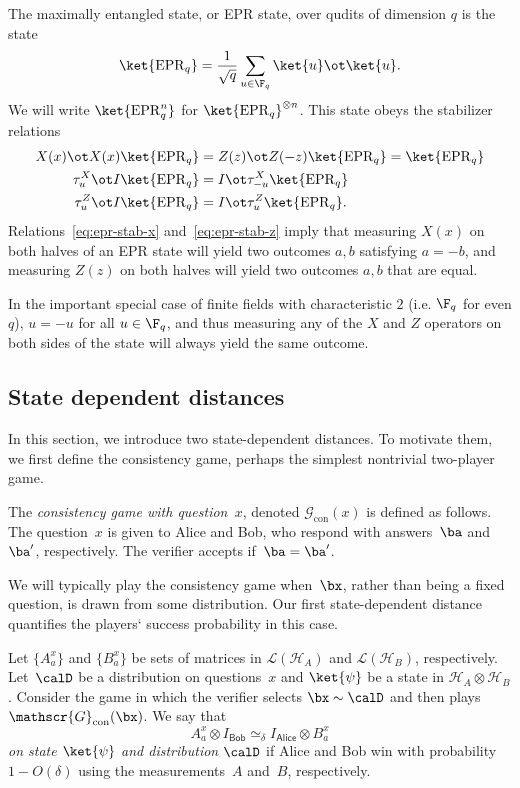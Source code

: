 \documentclass[11pt]{article}
\newcommand{\consistency}{\simeq}
\newcommand{\game}{\mathscr{G}}
\newcommand{\epr}{\mathrm{EPR}}
\newcommand{\reg}[1]{{\mathsf{#1}}}
\begin{document}
The maximally entangled state, or EPR state, over qudits of dimension
$q$ is the state
\[ \ket{\epr_q} = \frac{1}{\sqrt{q}} \sum_{u \in \F_q} \ket{u} \ot \ket{u}. \]
We will write $\ket{\epr_q^n}$ for $\ket{\epr_q}^{\otimes n}$.
This state obeys the stabilizer relations
\begin{align}
  X(x) \ot X(x) \ket{\epr_q} &= Z(z) \ot Z(-z) \ket{\epr_q} =
                             \ket{\epr_q} \label{eq:epr-stab} \\
  \tau^X_u \ot I \ket{\epr_q} &= I \ot \tau^X_{-u}
                              \ket{\epr_q} \label{eq:epr-stab-x} \\
  \tau^Z_u \ot I \ket{\epr_q} &= I \ot \tau^Z_{u} \ket{\epr_q} \label{eq:epr-stab-z}.
\end{align}
Relations~\eqref{eq:epr-stab-x} and~\eqref{eq:epr-stab-z} imply that
measuring $X(x)$ on both halves of an EPR state will yield two
outcomes $a,b$ satisfying $a = -b$, and measuring $Z(z)$ on both
halves will yield two outcomes $a,b$ that are equal.

In the important special case of finite fields with characteristic $2$
(i.e. $\F_q$ for even $q$), $u = -u$ for all $u \in \F_q$, and thus
measuring any of the $X$ and $Z$ operators on both sides of the state
will always yield the same outcome. 

  
\subsection{State dependent distances}

In this section, we introduce two state-dependent distances.
To motivate them, we first define the consistency game, perhaps the simplest nontrivial two-player game.

\begin{definition}
The \emph{consistency game with question~$x$}, denoted $\game_{\mathrm{con}}(x)$ is defined as follows.
The question~$x$ is given to Alice and Bob, who respond with answers~$\ba$ and~$\ba'$, respectively.
The verifier accepts if~$\ba = \ba'$.
\end{definition}

We will typically play the consistency game when~$\bx$, rather than being a fixed question, is drawn from some distribution.
Our first state-dependent distance quantifies the players` success probability in this case.

\begin{definition}
Let $\{A^x_a\}$ and $\{B^x_a\}$ be sets of matrices in $\mathcal{L}(\mathcal{H}_A)$ and $\mathcal{L}(\mathcal{H}_B)$, respectively.
Let~$\calD$ be a distribution on questions~$x$ and $\ket{\psi}$ be a state in $\mathcal{H}_A \otimes \mathcal{H}_B$.
Consider the game in which the verifier selects $\bx \sim \calD$ and then plays $\game_{\mathrm{con}}(\bx)$.
We say that
\begin{equation*}
A^x_a \otimes I_{\reg{Bob}} \consistency_{\delta} I_{\reg{Alice}} \otimes B^x_a
\end{equation*}
\emph{on state $\ket{\psi}$ and distribution $\calD$} if
Alice and Bob win with probability~$1-O(\delta)$ using the measurements~$A$ and~$B$, respectively.
\end{definition}
\end{document}
